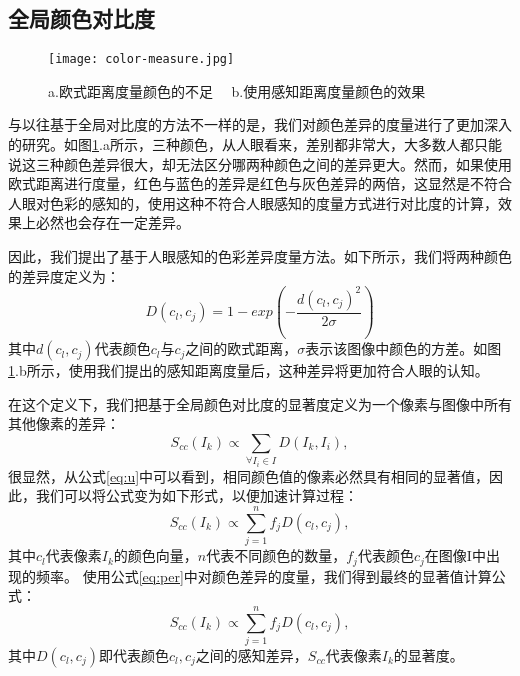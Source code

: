 \subsection{全局颜色对比度}
\begin{figure}[h]
\centering
\texttt{[image: color-measure.jpg]}
\caption{a.欧式距离度量颜色的不足 ~~b.使用感知距离度量颜色的效果}\label{fig:color_measure}
\end{figure}
与以往基于全局对比度的方法不一样的是，我们对颜色差异的度量进行了更加深入的研究。如图\ref{fig:color_measure}.a所示，三种颜色，从人眼看来，差别都非常大，大多数人都只能说这三种颜色差异很大，却无法区分哪两种颜色之间的差异更大。然而，如果使用欧式距离进行度量，红色与蓝色的差异是红色与灰色差异的两倍，这显然是不符合人眼对色彩的感知的，使用这种不符合人眼感知的度量方式进行对比度的计算，效果上必然也会存在一定差异。

因此，我们提出了基于人眼感知的色彩差异度量方法。如下所示，我们将两种颜色的差异度定义为：
\begin{equation}
  D(c_l, c_j) = 1 - exp(-\frac{d(c_l, c_j)^2}{2\sigma}) \label{eq:per}
\end{equation}
其中$d(c_l, c_j)$代表颜色$c_l$与$c_j$之间的欧式距离，$\sigma$表示该图像中颜色的方差。如图\ref{fig:color_measure}.b所示，使用我们提出的感知距离度量后，这种差异将更加符合人眼的认知。

在这个定义下，我们把基于全局颜色对比度的显著度定义为一个像素与图像中所有其他像素的差异：
\begin{equation}
  S_{cc}(I_k) \propto \sum_{\forall{I_i \in I}} D(I_k, I_i) ,\label{eq:u}
\end{equation}
很显然，从公式\ref{eq:u}中可以看到，相同颜色值的像素必然具有相同的显著值，因此，我们可以将公式变为如下形式，以便加速计算过程：
\begin{equation}
  S_{cc}(I_k) \propto \sum_{j=1}^{n} f_j D(c_l, c_j),
\end{equation}
其中$c_l$代表像素$I_k$的颜色向量，$n$代表不同颜色的数量，$f_j$代表颜色$c_j$在图像I中出现的频率。
使用公式\ref{eq:per}中对颜色差异的度量，我们得到最终的显著值计算公式：
\begin{equation}
  S_{cc}(I_k) \propto \sum_{j=1}^{n} f_j D(c_l, c_j),
\end{equation}
其中$D(c_l, c_j)$即代表颜色$c_l,c_j$之间的感知差异，$S_{cc}$代表像素$I_k$的显著度。

